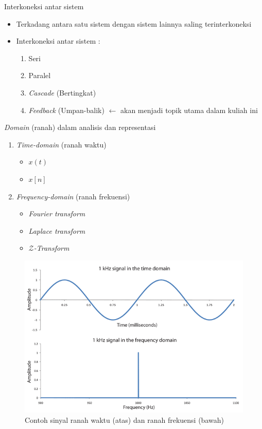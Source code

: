 \documentclass[aspectratio=169]{beamer}
\begin{document}
\begin{frame}{Interkoneksi antar sistem}
	\begin{itemize}
		\item Terkadang antara satu sistem dengan sistem lainnya saling terinterkoneksi
		\item Interkoneksi antar sistem :
		\begin{enumerate}
			\item Seri
			\item Paralel
			\item \textit{Cascade} (Bertingkat)
			\item \textit{Feedback} (Umpan-balik) $ \leftarrow $ akan menjadi topik utama dalam kuliah ini
		\end{enumerate}
	\end{itemize}
\end{frame}

\begin{frame}{\textit{Domain} (ranah) dalam analisis dan representasi}
	\begin{multicols}{2}
		\vfil\null
		\begin{enumerate}
			\item \textit{Time-domain} (ranah waktu)
			\begin{itemize}
				\item $ x(t) $
				\item $ x[n] $
			\end{itemize}
			\item \textit{Frequency-domain} (ranah frekuensi)
			\begin{itemize}
				\item \textit{Fourier transform}
				\item \textit{Laplace transform}
				\item \textit{$ \mathcal{Z} $-Transform}
			\end{itemize}
		\end{enumerate}
		\vfil\null
		\columnbreak
		\begin{figure}
			\centering
			\includegraphics[height=0.6\textheight]{gambar/00.TimeDomain}
			\caption{Contoh sinyal ranah waktu (atas) dan ranah frekuensi (bawah)}
		\end{figure}
	\end{multicols}
\end{frame}
\end{document}
